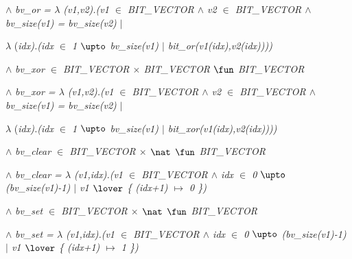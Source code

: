 \hspace*{0.20in} $\land$  \it bv\_or \rm =  $\lambda$ \rm (\it v1\rm ,\it v2\rm )\rm .\rm (\it v1 $\in$  \it BIT\_VECTOR  $\land$  \it v2  $\in$  \it BIT\_VECTOR  $\land$  \it bv\_size\rm (\it v1\rm ) \rm = \it bv\_size\rm (\it v2\rm )  $\mid$ 

\hspace*{0.80in} $\lambda$ \rm (\it idx\rm )\rm .\rm (\it idx  $\in$  \rm 1 $\upto$ \it bv\_size\rm (\it v1\rm )  $\mid$  \it bit\_or\rm (\it v1\rm (\it idx\rm )\rm ,\it v2\rm (\it idx\rm )\rm )\rm )\rm ) 

\vspace*{4mm}
\hspace*{0.20in} $\land$  \it bv\_xor  $\in$  \it BIT\_VECTOR  $\times$  \it BIT\_VECTOR  $\fun$  \it BIT\_VECTOR 

\hspace*{0.20in} $\land$  \it bv\_xor \rm =  $\lambda$ \rm (\it v1\rm ,\it v2\rm )\rm .\rm (\it v1 $\in$  \it BIT\_VECTOR  $\land$  \it v2  $\in$  \it BIT\_VECTOR  $\land$  \it bv\_size\rm (\it v1\rm ) \rm = \it bv\_size\rm (\it v2\rm )  $\mid$ 

\hspace*{0.40in} $\lambda$ \rm (\it idx\rm )\rm .\rm (\it idx  $\in$ \rm 1 $\upto$ \it bv\_size\rm (\it v1\rm )  $\mid$  \it bit\_xor\rm (\it v1\rm (\it idx\rm )\rm ,\it v2\rm (\it idx\rm )\rm )\rm )\rm ) 

\hspace*{0.20in}

\hspace*{0.20in} $\land$  \it bv\_clear  $\in$  \it BIT\_VECTOR  $\times$   $\nat$   $\fun$  \it BIT\_VECTOR 

\hspace*{0.20in} $\land$  \it bv\_clear \rm =  $\lambda$ \rm (\it v1\rm ,\it idx\rm )\rm .\rm (\it v1 $\in$  \it BIT\_VECTOR  $\land$  \it idx  $\in$  \rm 0 $\upto$ \rm (\it bv\_size\rm (\it v1\rm )\rm -\rm 1\rm )  $\mid$  \it v1  $\lover$  \rm \{ \rm (\it idx\rm +\rm 1\rm )  $\mapsto$  \rm 0 \rm \}\rm )

\hspace*{0.30in}

\hspace*{0.20in} $\land$  \it bv\_set  $\in$  \it BIT\_VECTOR  $\times$   $\nat$   $\fun$  \it BIT\_VECTOR 

\hspace*{0.20in} $\land$  \it bv\_set \rm =  $\lambda$ \rm (\it v1\rm ,\it idx\rm )\rm .\rm (\it v1 $\in$  \it BIT\_VECTOR  $\land$  \it idx  $\in$  \rm 0 $\upto$ \rm (\it bv\_size\rm (\it v1\rm )\rm -\rm 1\rm )  $\mid$  \it v1  $\lover$  \rm \{ \rm (\it idx\rm +\rm 1\rm )  $\mapsto$  \rm 1 \rm \}\rm ) 

